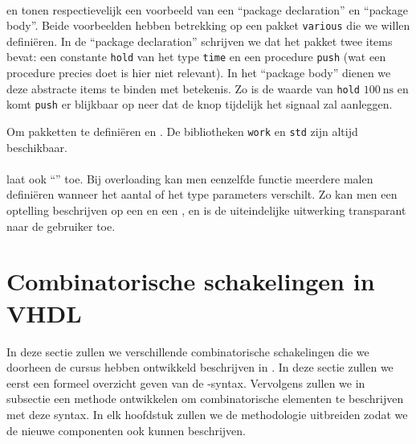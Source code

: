 \paragraph{}


 en  tonen respectievelijk een voorbeeld van een ``package declaration'' en ``package body''. Beide voorbeelden hebben betrekking op een pakket \texttt{various} die we willen defini\"eren. In de ``package declaration'' schrijven we dat het pakket twee items bevat: een constante \texttt{hold} van het type \texttt{time} en een procedure \texttt{push} (wat een procedure precies doet is hier niet relevant). In het ``package body'' dienen we deze abstracte items te binden met betekenis. Zo is de waarde van \texttt{hold} $100~\mbox{ns}$ en komt \texttt{push} er blijkbaar op neer dat de knop tijdelijk het signaal  zal aanleggen.

Om pakketten te defini\"eren en . De bibliotheken \texttt{work} en \texttt{std} zijn altijd beschikbaar.

\paragraph{}
\tvhdl{} laat ook ``'' toe. Bij overloading kan men eenzelfde functie meerdere malen defini\"eren wanneer het aantal of het type parameters verschilt. Zo kan men een optelling beschrijven op een  en een , en is de uiteindelijke uitwerking transparant naar de gebruiker toe.

\section{Combinatorische schakelingen in VHDL}

In deze sectie zullen we verschillende combinatorische schakelingen die we doorheen de cursus hebben ontwikkeld beschrijven in \tvhdl{}. In deze sectie zullen we eerst een formeel overzicht geven van de \tvhdl{}-syntax. Vervolgens zullen we in subsectie  een methode ontwikkelen om combinatorische elementen te beschrijven met deze syntax. In elk hoofdstuk zullen we de methodologie uitbreiden zodat we de nieuwe componenten ook kunnen beschrijven.

